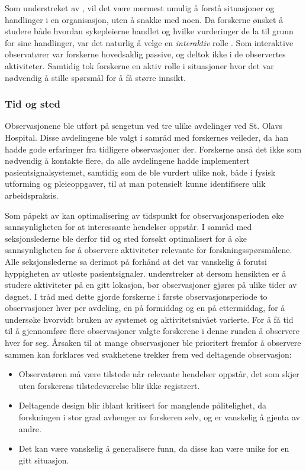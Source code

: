 \noindent
Som understreket av \citet{Myers13}, vil det være nærmest umulig å forstå situasjoner og handlinger i en organisasjon, uten å snakke med noen. Da forskerne ønsket å studere både hvordan sykepleierne handlet og hvilke vurderinger de la til grunn for sine handlinger, var det naturlig å velge en \textit{interaktiv} rolle \citep{Tjora}.  Som interaktive observatører var forskerne hovedsaklig passive, og deltok ikke i de observertes aktiviteter. Samtidig tok forskerne en aktiv rolle i situasjoner hvor det var nødvendig å stille spørsmål for å få større innsikt.
 
\subsubsection{Tid og sted}
Observasjonene ble utført på sengetun ved tre ulike avdelinger ved St. Olavs Hospital. Disse avdelingene ble valgt i samråd med forskernes veileder, da han hadde gode erfaringer fra tidligere observasjoner der. Forskerne anså det ikke som nødvendig å kontakte flere, da alle avdelingene hadde implementert pasientsignalsystemet, samtidig som de ble vurdert ulike nok, både i fysisk utforming og pleieoppgaver, til at man potensielt kunne identifisere ulik arbeidspraksis.
 
\noindent
Som påpekt av \citet{Millen00} kan optimalisering av tidspunkt for observasjonsperioden øke sannsynligheten for at interessante hendelser oppstår. I samråd med seksjonslederne ble derfor tid og sted forsøkt optimalisert for å øke sannsynligheten for å observere aktiviteter relevante for forskningsspørsmålene. Alle seksjonslederne sa derimot på forhånd at det var vanskelig å forutsi hyppigheten av utløste pasientsignaler. \citet{Blomberg93} understreker at dersom hensikten er å studere aktiviteter på en gitt lokasjon, bør observasjoner gjøres på ulike tider av døgnet. I tråd med dette gjorde forskerne i første observasjonsperiode to observasjoner hver per avdeling, en på formiddag og en på ettermiddag, for å undersøke hvorvidt bruken av systemet og aktivitetsnivået varierte. For å få tid til å gjennomføre flere observasjoner valgte forskerene i denne runden å observere hver for seg. Årsaken til at mange observasjoner ble prioritert fremfor å observere sammen kan forklares ved svakhetene \citet{Oates} trekker frem ved deltagende observasjon: 

\begin{itemize}
\item Observatøren må være tilstede når relevante hendelser oppstår, det som skjer uten forskerens tilstedeværelse blir ikke registrert.
\item Deltagende design blir iblant kritisert for manglende pålitelighet, da forskningen i stor grad avhenger av forskeren selv, og er vanskelig å gjenta av andre.
\item Det kan være vanskelig å generalisere funn, da disse kan være unike for en gitt situasjon.
\end{itemize}

